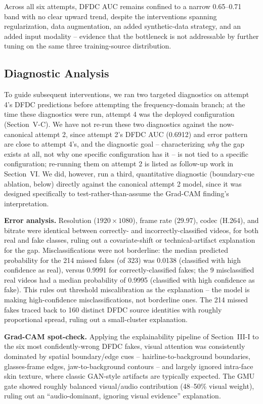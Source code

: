 \documentclass[conference]{IEEEtran}
\begin{document}
Across all six attempts, DFDC AUC remains confined to a narrow
0.65--0.71 band with no clear upward trend, despite the interventions
spanning regularization, data augmentation, an added synthetic-data
strategy, and an added input modality -- evidence that the bottleneck is
not addressable by further tuning on the same three training-source
distribution.

\subsection{Diagnostic Analysis}
To guide subsequent interventions, we ran two targeted diagnostics on
attempt 4's DFDC predictions before attempting the frequency-domain branch;
at the time these diagnostics were run, attempt 4 was the deployed
configuration (Section~V-C). We have not re-run these two diagnostics
against the now-canonical attempt 2, since attempt 2's DFDC AUC (0.6912) and
error pattern are close to attempt 4's, and the diagnostic goal --
characterizing \emph{why} the gap exists at all, not why one specific
configuration has it -- is not tied to a specific configuration; re-running
them on attempt 2 is listed as follow-up work in Section~VI. We did,
however, run a third, quantitative diagnostic (boundary-cue ablation, below)
directly against the canonical attempt 2 model, since it was designed
specifically to test-rather-than-assume the Grad-CAM finding's
interpretation.

\textbf{Error analysis.} Resolution ($1920{\times}1080$), frame rate
(29.97), codec (H.264), and bitrate were identical between correctly- and
incorrectly-classified videos, for both real and fake classes, ruling out a
covariate-shift or technical-artifact explanation for the gap.
Misclassifications were not borderline: the median predicted probability
for the 214 missed fakes (of 323) was 0.0138 (classified with high
confidence as real), versus 0.9991 for correctly-classified fakes; the 9
misclassified real videos had a median probability of 0.9995 (classified
with high confidence as fake). This rules out
threshold miscalibration as the explanation -- the model is making
high-confidence misclassifications, not borderline ones. The 214 missed
fakes
traced back to 160 distinct DFDC source identities with roughly
proportional spread, ruling out a small-cluster explanation.

\textbf{Grad-CAM spot-check.} Applying the explainability pipeline of
Section~III-I to the six most confidently-wrong DFDC fakes, visual
attention was consistently dominated by spatial boundary/edge cues --
hairline-to-background boundaries, glasses-frame edges, jaw-to-background
contours -- and largely ignored intra-face skin texture, where classic
GAN-style artifacts are typically expected. The GMU gate showed roughly
balanced visual/audio contribution (48--50\% visual weight), ruling out an
``audio-dominant, ignoring visual evidence'' explanation.
\end{document}
